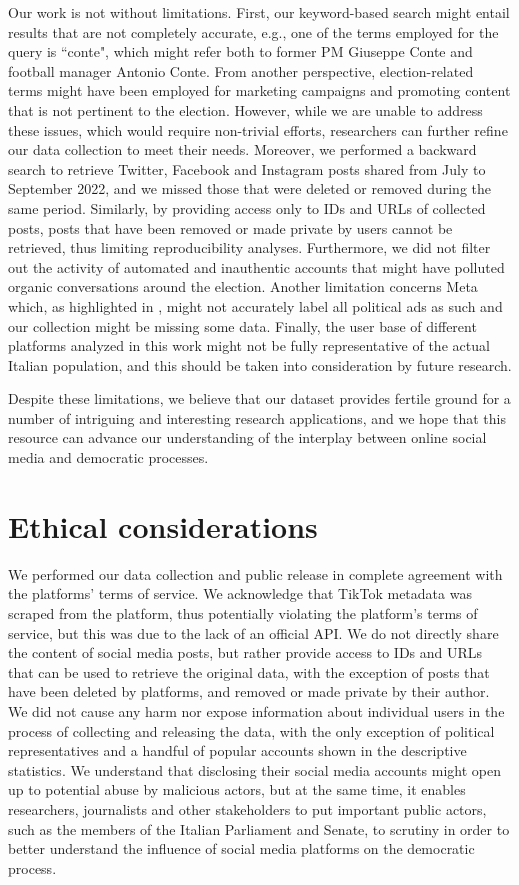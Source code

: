 \documentclass[letterpaper]{article} %
\begin{document}
Our work is not without limitations. First, our keyword-based search might entail results that are not completely accurate, e.g., one of the terms employed for the query is ``conte", which might refer both to former PM Giuseppe Conte and football manager Antonio Conte. From another perspective, election-related terms might have been employed for marketing campaigns and promoting content that is not pertinent to the election. However, while we are unable to address these issues, which would require non-trivial efforts, researchers can further refine our data collection to meet their needs. Moreover, we performed a backward search to retrieve Twitter, Facebook and Instagram posts shared from July to September 2022, and we missed those that were deleted or removed during the same period. Similarly, by providing access only to IDs and URLs of collected posts, posts that have been removed or made private by users cannot be retrieved, thus limiting reproducibility analyses. Furthermore, we did not filter out the activity of automated and inauthentic accounts that might have polluted organic conversations around the election. Another limitation concerns Meta which, as highlighted in \cite{le2022audit}, might not accurately label all political ads as such and our collection might be missing some data. Finally, the user base of different platforms analyzed in this work might not be fully representative of the actual Italian population, and this should be taken into consideration by future research.

Despite these limitations, we believe that our dataset provides fertile ground for a number of intriguing and interesting research applications, and we hope that this resource can advance our understanding of the interplay between online social media and democratic processes.

\section{Ethical considerations}
We performed our data collection and public release in complete agreement with the platforms' terms of service. We acknowledge that TikTok metadata was scraped from the platform, thus potentially violating the platform's terms of service, but this was due to the lack of an official API\cite{freelon2018computational}.  We do not directly share the content of social media posts, but rather provide access to IDs and URLs that can be used to retrieve the original data, with the exception of posts that have been deleted by platforms, and removed or made private by their author. We did not cause any harm nor expose information about individual users in the process of collecting and releasing the data, with the only exception of political representatives and a handful of popular accounts shown in the descriptive statistics. We understand that disclosing their social media accounts might open up to potential abuse by malicious actors, but at the same time, it enables researchers, journalists and other stakeholders to put important public actors, such as the members of the Italian Parliament and Senate, to scrutiny in order to better understand the influence of social media platforms on the democratic process.
\end{document}
